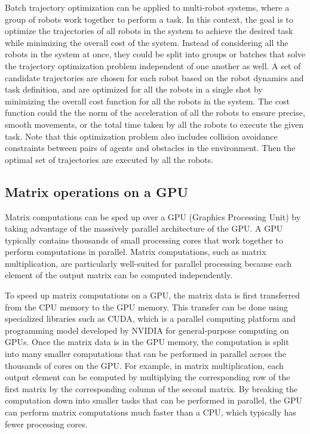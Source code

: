 Batch trajectory optimization can be applied to multi-robot systems, where a group of robots work together to perform a task. In this context, the goal is to optimize the trajectories of all robots in the system to achieve the desired task while minimizing the overall cost of the system. Instead of considering all the robots in the system at once, they could be split into groups or batches that solve the trajectory optimization problem independent of one another as well. A set of candidate trajectories are chosen for each robot based on the robot dynamics and task definition, and are optimized for all the robots in a single shot by minimizing the overall cost function for all the robots in the system. The cost function could the the norm of the acceleration of all the robots to ensure precise, smooth movements, or the total time taken by all the robots to execute the given task. Note that this optimization problem also includes collision avoidance constraints between pairs of agents and obstacles in the environment. Then the optimal set of trajectories are executed by all the robots. 

\subsection{Matrix operations on a GPU}

Matrix computations can be sped up over a GPU (Graphics Processing Unit) by taking advantage of the massively parallel architecture of the GPU. A GPU typically contains thousands of small processing cores that work together to perform computations in parallel. Matrix computations, such as matrix multiplication, are particularly well-suited for parallel processing because each element of the output matrix can be computed independently.

To speed up matrix computations on a GPU, the matrix data is first transferred from the CPU memory to the GPU memory. This transfer can be done using specialized libraries such as CUDA, which is a parallel computing platform and programming model developed by NVIDIA for general-purpose computing on GPUs. Once the matrix data is in the GPU memory, the computation is split into many smaller computations that can be performed in parallel across the thousands of cores on the GPU. For example, in matrix multiplication, each output element can be computed by multiplying the corresponding row of the first matrix by the corresponding column of the second matrix. By breaking the computation down into smaller tasks that can be performed in parallel, the GPU can perform matrix computations much faster than a CPU, which typically has fewer processing cores.


